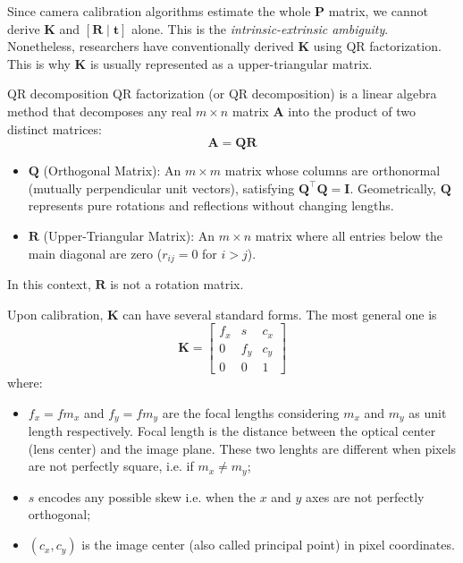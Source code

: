 Since camera calibration algorithms estimate the whole $\mathbf{P}$ matrix, we cannot derive $\mathbf{K}$ and $[\mathbf{R}\mid \mathbf{t}]$ alone. This is the \emph{intrinsic-extrinsic ambiguity}. Nonetheless, researchers have conventionally derived $\mathbf{K}$ using QR factorization. This is why $\mathbf{K}$ is usually represented as a upper-triangular matrix.

\begin{observation}{QR decomposition}
QR factorization (or QR decomposition) is a linear algebra method that decomposes any real $m \times n$ matrix $\mathbf{A}$ into the product of two distinct matrices:
$$\mathbf{A} = \mathbf{Q}\mathbf{R}$$
\begin{itemize}
\item $\mathbf{Q}$ (Orthogonal Matrix): An $m \times m$ matrix whose columns are orthonormal (mutually perpendicular unit vectors), satisfying $\mathbf{Q}^{\top} \mathbf{Q} = \mathbf{I}$. Geometrically, $\mathbf{Q}$ represents pure rotations and reflections without changing lengths.
\item $\mathbf{R}$ (Upper-Triangular Matrix): An $m \times n$ matrix where all entries below the main diagonal are zero ($r_{ij} = 0$ for $i > j$).
\end{itemize}

In this context, $\mathbf{R}$ is not a rotation matrix.
\end{observation}

Upon calibration, $\mathbf{K}$ can have several standard forms. The most general one is
$$\mathbf{K}=\begin{bmatrix}
f_{x} & s & c_{x} \\
0 & f_{y} & c_{y} \\
0 & 0 & 1
\end{bmatrix}$$
where:
\begin{itemize}
\item $f_{x}=fm_{x}$ and $f_{y}=fm_{y}$ are the focal lengths considering $m_{x}$ and $m_{y}$ as unit length respectively. Focal length is the distance between the optical center (lens center) and the image plane. These two lenghts are different when pixels are not perfectly square, i.e. if $m_{x}\neq m_{y}$;
\item $s$ encodes any possible skew i.e. when the $x$ and $y$ axes are not perfectly orthogonal;
\item $(c_{x}, c_{y})$ is the image center (also called principal point) in pixel coordinates.
\end{itemize}

